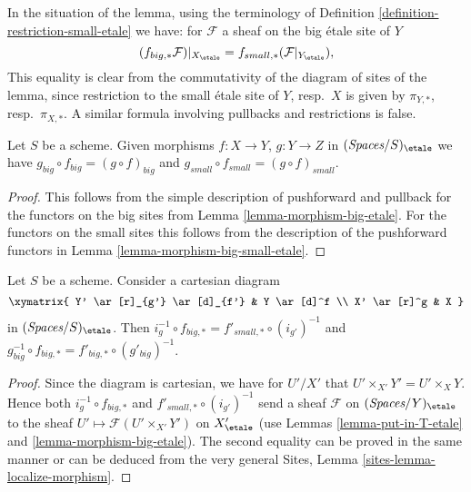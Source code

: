 \noindent
In the situation of the lemma, using the terminology of
Definition \ref{definition-restriction-small-etale}
we have: for $\mathcal{F}$ a sheaf on the big \'etale site of $Y$
$$
(f_{big, *}\mathcal{F})|_{X_\etale} =
f_{small, *}(\mathcal{F}|_{Y_\etale}),
$$
This equality is clear from the commutativity of the diagram of
sites of the lemma, since restriction to the small \'etale site of
$Y$, resp.\ $X$ is given by $\pi_{Y, *}$, resp.\ $\pi_{X, *}$. A similar
formula involving pullbacks and restrictions is false.

\begin{lemma}
\label{lemma-composition-etale}
Let $S$ be a scheme. Given morphisms $f : X \to Y$, $g : Y \to Z$
in $(\textit{Spaces}/S)_\etale$ we have
$g_{big} \circ f_{big} = (g \circ f)_{big}$ and
$g_{small} \circ f_{small} = (g \circ f)_{small}$.
\end{lemma}

\begin{proof}
This follows from the simple description of pushforward
and pullback for the functors on the big sites from
Lemma \ref{lemma-morphism-big-etale}. For the functors
on the small sites this follows from the description of
the pushforward functors in Lemma \ref{lemma-morphism-big-small-etale}.
\end{proof}

\begin{lemma}
\label{lemma-morphism-big-small-cartesian-diagram-etale}
Let $S$ be a scheme. Consider a cartesian diagram
$$
\xymatrix{
Y' \ar[r]_{g'} \ar[d]_{f'} & Y \ar[d]^f \\
X' \ar[r]^g & X
}
$$
in $(\textit{Spaces}/S)_\etale$. Then
$i_g^{-1} \circ f_{big, *} = f'_{small, *} \circ (i_{g'})^{-1}$
and $g_{big}^{-1} \circ f_{big, *} = f'_{big, *} \circ (g'_{big})^{-1}$.
\end{lemma}

\begin{proof}
Since the diagram is cartesian, we have for $U'/X'$
that $U' \times_{X'} Y' = U' \times_X Y$. Hence both
$i_g^{-1} \circ f_{big, *}$ and $f'_{small, *} \circ (i_{g'})^{-1}$
send a sheaf $\mathcal{F}$ on $(\textit{Spaces}/Y)_\etale$ to the sheaf
$U' \mapsto \mathcal{F}(U' \times_{X'} Y')$ on $X'_\etale$
(use Lemmas \ref{lemma-put-in-T-etale} and \ref{lemma-morphism-big-etale}).
The second equality can be proved in the same manner or can be
deduced from the very general
Sites, Lemma \ref{sites-lemma-localize-morphism}.
\end{proof}

